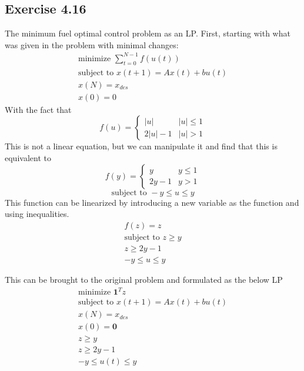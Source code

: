 \subsection{Exercise 4.16}
The minimum fuel optimal control problem as an LP. First, starting with what was given in the problem with minimal changes:
\begin{equation}
  \begin{aligned}
    \text{minimize } \sum_{t=0}^{N-1} f(u(t)) \\
    \text{subject to } x(t+1) = Ax(t) + bu(t) \\
    x(N) = x_{des} \\ 
    x(0) = 0
  \end{aligned}
\end{equation}
With the fact that 
\begin{equation}
  f(u) = 
  \begin{cases} 
      |u| & |u| \leq 1 \\
      2|u| -1 & |u|> 1
  \end{cases}
\end{equation}
This is not a linear equation, but we can manipulate it and find that this is equivalent to
\begin{equation}
  f(y) = 
  \begin{cases} 
      y & y \leq 1 \\
      2y -1 & y> 1
  \end{cases}
\end{equation}
\begin{equation}
  \text{subject to } -y \leq u \leq y
\end{equation}
This function can be linearized by introducing a new variable as the function and using inequalities.
\begin{equation}
  \begin{aligned}
    f(z) = z \\
    \text{subject to } z \geq y \\
    z \geq 2y-1 \\
    -y \leq u \leq y
  \end{aligned}
\end{equation}

This can be brought to the original problem and formulated as the below LP
\begin{equation}
  \begin{aligned}
    \text{minimize }\textbf{1}^T z \\
    \text{subject to } x(t+1) = Ax(t) + bu(t) \\
    x(N) = x_{des} \\
    x(0) = \textbf{0}  \\
    z \geq y \\
    z \geq 2y -1 \\
    -y \leq u(t) \leq y
  \end{aligned}
\end{equation}


